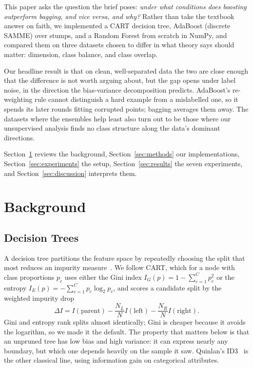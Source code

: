 \documentclass[conference]{IEEEtran}
\begin{document}
This paper asks the question the brief poses: \textit{under what conditions
does boosting outperform bagging, and vice versa, and why?}  Rather than
take the textbook answer on faith, we implemented a CART decision tree,
AdaBoost (discrete SAMME) over stumps, and a Random Forest from scratch in
NumPy, and compared them on three datasets chosen to differ in what theory
says should matter: dimension, class balance, and class overlap.

Our headline result is that on clean, well-separated data the two are close
enough that the difference is not worth arguing about, but the gap opens
under label noise, in the direction the bias-variance decomposition
predicts.  AdaBoost's re-weighting rule cannot distinguish a hard example
from a mislabelled one, so it spends its later rounds fitting corrupted
points; bagging averages them away.  The datasets where the ensembles help
least also turn out to be those where our unsupervised analysis finds no
class structure along the data's dominant directions.

Section~\ref{sec:related} reviews the background,
Section~\ref{sec:methods} our implementations,
Section~\ref{sec:experiments} the setup,
Section~\ref{sec:results} the seven experiments, and
Section~\ref{sec:discussion} interprets them.

\section{Background}
\label{sec:related}
\subsection{Decision Trees}
A decision tree partitions the feature space by repeatedly choosing the
split that most reduces an impurity measure~\cite{hastie2009elements}.
We follow CART, which for a node with class proportions $p_c$ uses either
the Gini index $I_G(p) = 1 - \sum_{c=1}^{C} p_c^2$ or the entropy
$I_E(p) = -\sum_{c=1}^{C} p_c \log_2 p_c$, and scores a candidate split by
the weighted impurity drop
\begin{equation}
\Delta I = I(\text{parent}) - \frac{N_L}{N} I(\text{left})
                             - \frac{N_R}{N} I(\text{right}).
\label{eq:gain}
\end{equation}
Gini and entropy rank splits almost identically; Gini is cheaper because it
avoids the logarithm, so we made it the default.  The property that matters
below is that an unpruned tree has low bias and high variance: it can
express nearly any boundary, but which one depends heavily on the sample it
saw.  Quinlan's ID3~\cite{quinlan1986induction} is the other classical
line, using information gain on categorical attributes.
\end{document}
